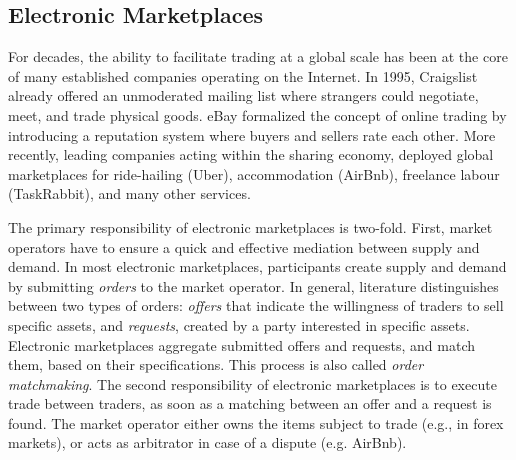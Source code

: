 \subsection{Electronic Marketplaces}
For decades, the ability to facilitate trading at a global scale has been at the core of many established companies operating on the Internet.
In 1995, Craigslist already offered an unmoderated mailing list where strangers could negotiate, meet, and trade physical goods.
eBay formalized the concept of online trading by introducing a reputation system where buyers and sellers rate each other.
More recently, leading companies acting within the sharing economy, deployed global marketplaces for ride-hailing (Uber), accommodation (AirBnb), freelance labour (TaskRabbit), and many other services.

The primary responsibility of electronic marketplaces is two-fold.
First, market operators have to ensure a quick and effective mediation between supply and demand.
In most electronic marketplaces, participants create supply and demand by submitting \emph{orders} to the market operator.
In general, literature distinguishes between two types of orders: \emph{offers} that indicate the willingness of traders to sell specific assets, and \emph{requests}, created by a party interested in specific assets.
Electronic marketplaces aggregate submitted offers and requests, and match them, based on their specifications.
This process is also called \emph{order matchmaking}.
The second responsibility of electronic marketplaces is to execute trade between traders, as soon as a matching between an offer and a request is found.
The market operator either owns the items subject to trade (e.g., in forex markets), or acts as arbitrator in case of a dispute (e.g. AirBnb).

